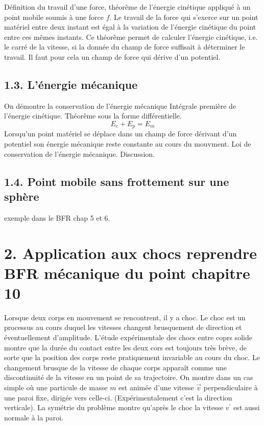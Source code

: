 \documentclass[french, a4paper, 10pt, twocolumn, landscape]{article}
\begin{document}
Définition du travail d'une force, théorême de l'énergie cinétique appliqué à un point mobile soumis à une force $f$. Le travail de la force qui s'exerce sur un point matériel entre deux instant est égal à la variation de l'énergie cinétique du point entre ces mêmes instants. Ce théorême permet de calculer l'énergie cinétique, i.e. le carré de la vitesse, si la donnée du champ de force suffisait à déterminer le travail. Il faut pour cela un champ de force qui dérive d'un potentiel.\medskip

\subsection*{1.3. L'énergie mécanique}
On démontre la conservation de l'énergie mécanique 
Intégrale première de l'énergie cinétique. Théorême sous la forme différentielle. 
\begin{equation}
    E_c+E_p=E_m
\end{equation}
Lorsqu'un point matériel se déplace dans un champ de force dérivant d'un potentiel son énergie mécanique reste constante au cours du mouvment. Loi de conservation de l'énergie mécanique. Discussion.

\subsection*{1.4. Point mobile sans frottement sur une sphère}

exemple dans le BFR chap 5 et 6.

\section*{2. Application aux chocs reprendre BFR mécanique du point chapitre  10}
Lorsque deux corps en mouvement se rencontrent, il y a choc. Le choc est un processus au cours duquel les vitesses changent brusquement de direction et éventuellement d'amplitude. L'étude expérimentale des chocs entre coprs solide montre que la durée du contact entre les deux cors est toujours très brève, de sorte que la position des corps reste pratiquement invariable au cours du choc. Le changement brusque de la vitesse de chaque corps apparaît comme une discontinuité de la vitesse en un point de sa trajectoire. On montre dans un cas simple où une particule de masse $m$ est animée d'une vitesse $\vec{v}$ perpendiculaire à une paroi fixe, dirigée vers celle-ci. (Expérimentalement c'est la direction verticale). La symétrie du problème montre qu'après le choc la vitesse $v^\prime$ est aussi normale à la paroi.
\end{document}
